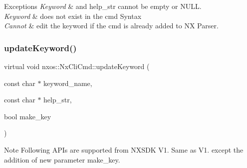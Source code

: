 \begin{DoxyExceptions}{Exceptions}
{\em Keyword} & and help\+\_\+str cannot be empty or N\+U\+LL. \\
\hline
{\em Keyword} & does not exist in the cmd Syntax \\
\hline
{\em Cannot} & edit the keyword if the cmd is already added to NX Parser. \\
\hline
\end{DoxyExceptions}
\mbox{\label{classnxos_1_1_nx_cli_cmd_ae1669d9fbeaa164494a503379ca52b86}} 
\subsubsection{\texorpdfstring{update\+Keyword()}{updateKeyword()}\hspace{0.1cm}{\footnotesize\ttfamily [2/2]}}
{\footnotesize\ttfamily virtual void nxos\+::\+Nx\+Cli\+Cmd\+::update\+Keyword (\begin{DoxyParamCaption}\item[{const char $\ast$}]{keyword\+\_\+name,  }\item[{const char $\ast$}]{help\+\_\+str,  }\item[{bool}]{make\+\_\+key }\end{DoxyParamCaption})\hspace{0.3cm}{\ttfamily [pure virtual]}}

\begin{DoxyNote}{Note}
Following A\+P\+Is are supported from N\+X\+S\+DK V1. Same as V1. except the addition of new parameter make\+\_\+key.
\end{DoxyNote}

